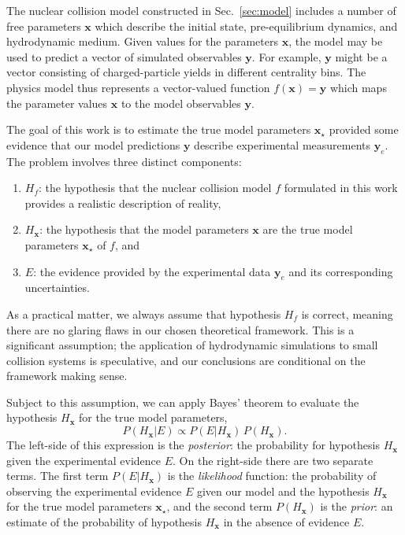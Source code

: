 \documentclass[aps,prc,reprint,amsmath,nofootinbib]{revtex4-1}
\newcommand{\xv}{\mathbf x}
\newcommand{\yv}{\mathbf y}
\begin{document}
The nuclear collision model constructed in Sec.~\ref{sec:model} includes a number of free parameters $\xv$ which describe the initial state, pre-equilibrium dynamics, and hydrodynamic medium.
Given values for the parameters $\xv$, the model may be used to predict a vector of simulated observables $\yv$.
For example, $\yv$ might be a vector consisting of charged-particle yields in different centrality bins.
The physics model thus represents a vector-valued function $f(\xv) = \yv$ which maps the parameter values $\xv$ to the model observables $\yv$.

The goal of this work is to estimate the true model parameters $\xv_\star$ provided some evidence that our model predictions $\yv$ describe experimental measurements $\yv_e$.
The problem involves three distinct components:
\begin{enumerate}[itemsep=0pt, leftmargin=2\parindent]
  \item $H_f$: the hypothesis that the nuclear collision model $f$ formulated in this work provides a realistic description of reality,
  \item $H_\xv$: the hypothesis that the model parameters $\xv$ are the true model parameters $\xv_\star$ of $f$, and
  \item $E$: the evidence provided by the experimental data $\yv_e$ and its corresponding uncertainties.
\end{enumerate}
As a practical matter, we always assume that hypothesis $H_f$ is correct, meaning there are no glaring flaws in our chosen theoretical framework.
This is a significant assumption; the application of hydrodynamic simulations to small collision systems is speculative, and our conclusions are conditional on the framework making sense.

Subject to this assumption, we can apply Bayes' theorem to evaluate the hypothesis $H_\xv$ for the true model parameters,
\begin{equation}
  \label{eq:bayes}
  P(H_\xv | E) \propto P(E | H_\xv)\, P(H_\xv).
\end{equation}
The left-side of this expression is the \emph{posterior}: the probability for hypothesis $H_\xv$ given the experimental evidence $E$.
On the right-side there are two separate terms.
The first term $P(E | H_\xv)$ is the \emph{likelihood} function: the probability of observing the experimental evidence $E$ given our model and the hypothesis $H_\xv$ for the true model parameters $\xv_\star$, and the second term $P(H_\xv)$ is the \emph{prior}: an estimate of the probability of hypothesis $H_\xv$ in the absence of evidence $E$.
\end{document}
